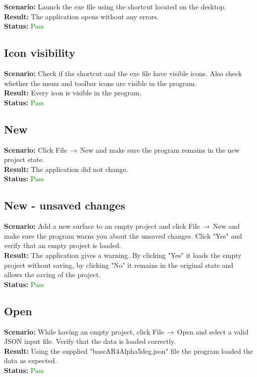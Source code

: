 \documentclass[a4paper, 11pt, article]{report}
\begin{document}
\noindent \textbf{Scenario:} Launch the exe file using the shortcut located on the desktop.
\\
\noindent \textbf{Result:} The application opens without any errors.
\\
\noindent \textbf{Status:} \textcolor{green}{Pass}

\subsection{Icon visibility}

\noindent \textbf{Scenario:} Check if the shortcut and the exe file have visible icons. Also check whether the menu and toolbar icons are visible in the program.
\\
\noindent \textbf{Result:} Every icon is visible in the program.
\\
\noindent \textbf{Status:} \textcolor{green}{Pass}

\subsection{New}

\noindent \textbf{Scenario:} Click File$\,\to\,$New and make sure the program remains in the new project state. 
\\
\noindent \textbf{Result:} The application did not change.
\\
\noindent \textbf{Status:} \textcolor{green}{Pass}

\subsection{New - unsaved changes}

\noindent \textbf{Scenario:} Add a new surface to an empty project and click File$\,\to\,$New and make sure the program warns you about the unsaved changes. Click "Yes" and verify that an empty project is loaded.
\\
\noindent \textbf{Result:} The application gives a warning. By clicking "Yes" it loads the empty project without saving, by clicking "No" it remains in the original state and allows the saving of the project.
\\
\noindent \textbf{Status:} \textcolor{green}{Pass}

\subsection{Open}

\noindent \textbf{Scenario:} While having an empty project, click File$\,\to\,$Open and select a valid JSON input file. Verify that the data is loaded correctly.
\\
\noindent \textbf{Result:} Using the supplied "baseAR4Alpha5deg.json" file the program loaded the data as expected.
\\
\noindent \textbf{Status:} \textcolor{green}{Pass}
\end{document}
